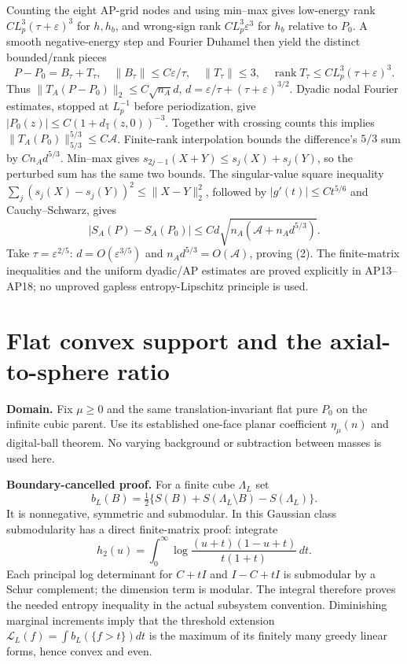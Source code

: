 \documentclass[10pt]{article}
\newcommand{\rank}{\operatorname{rank}}
\newcommand{\eps}{\varepsilon}
\begin{document}
Counting the eight AP-grid nodes and using min--max gives low-energy
rank $CL_p^3(\tau+\eps)^3$ for $h,h_b$, and wrong-sign rank
$CL_p^3\eps^3$ for $h_b$ relative to $P_0$. A smooth negative-energy
step and Fourier Duhamel then yield the distinct bounded/rank pieces
\[
 P-P_0=B_\tau+T_\tau,\quad
 \|B_\tau\|\leq C\eps/\tau,\quad
 \|T_\tau\|\leq3,\quad \rank T_\tau\leq CL_p^3(\tau+\eps)^3.
\]
Thus $\|T_A(P-P_0)\|_2\leq C\sqrt{n_A}d$,
$d=\eps/\tau+(\tau+\eps)^{3/2}$.
Dyadic nodal Fourier estimates, stopped at $L_p^{-1}$ before
periodization, give $|P_0(z)|\leq C(1+d_{\mathbb T}(z,0))^{-3}$.
Together with crossing counts this implies
$\|T_A(P_0)\|_{5/3}^{5/3}\leq C\mathcal A$.
Finite-rank interpolation bounds the difference's $5/3$ sum by
$Cn_Ad^{5/3}$. Min--max gives
$s_{2j-1}(X+Y)\leq s_j(X)+s_j(Y)$, so the perturbed sum has the
same two bounds. The singular-value square inequality
$\sum_j(s_j(X)-s_j(Y))^2\leq\|X-Y\|_2^2$, followed by
$|g'(t)|\leq Ct^{5/6}$ and Cauchy--Schwarz, gives
\[
 |S_A(P)-S_A(P_0)|\leq
 Cd\sqrt{n_A(\mathcal A+n_Ad^{5/3})}.
\]
Take $\tau=\eps^{2/5}$: $d=O(\eps^{3/5})$ and
$n_Ad^{5/3}=O(\mathcal A)$, proving (2).
The finite-matrix inequalities and the uniform dyadic/AP estimates are
proved explicitly in AP13--AP18; no unproved gapless entropy-Lipschitz
principle is used.

\section{Flat convex support and the axial-to-sphere ratio}
\textbf{Domain.} Fix $\mu\geq0$ and the same translation-invariant
flat pure $P_0$ on the infinite cubic parent. Use its established
one-face planar coefficient $\eta_\mu(n)$ and digital-ball theorem.
No varying background or subtraction between masses is used here.

\textbf{Boundary-cancelled proof.} For a finite cube $\Lambda_L$ set
\[
 b_L(B)=\tfrac12\{S(B)+S(\Lambda_L\setminus B)-S(\Lambda_L)\}.
\]
It is nonnegative, symmetric and submodular. In this Gaussian class
submodularity has a direct finite-matrix proof: integrate
\[
 h_2(u)=\int_0^\infty\log
       \frac{(u+t)(1-u+t)}{t(1+t)}\,dt.
\]
Each principal log determinant for $C+tI$ and $I-C+tI$ is submodular
by a Schur complement; the dimension term is modular. The integral
therefore proves the needed entropy inequality in the actual subsystem
convention. Diminishing marginal increments imply that the threshold
extension $\mathcal L_L(f)=\int b_L(\{f>t\})dt$ is the maximum
of its finitely many greedy linear forms, hence convex and even.
\end{document}

